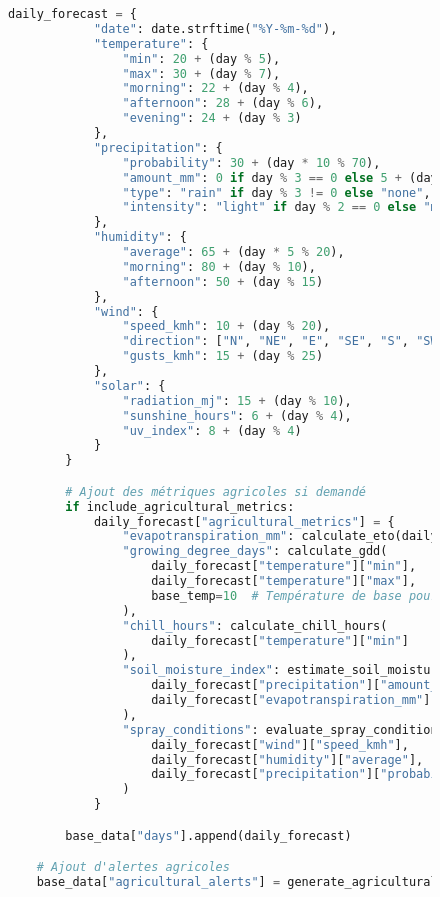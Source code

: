\begin{figure}[H]
\begin{lstlisting}[language=Python, caption=Implémentation d'outils spécialisés pour l'agriculture]
        daily_forecast = {
            "date": date.strftime("%Y-%m-%d"),
            "temperature": {
                "min": 20 + (day % 5),
                "max": 30 + (day % 7),
                "morning": 22 + (day % 4),
                "afternoon": 28 + (day % 6),
                "evening": 24 + (day % 3)
            },
            "precipitation": {
                "probability": 30 + (day * 10 % 70),
                "amount_mm": 0 if day % 3 == 0 else 5 + (day * 3),
                "type": "rain" if day % 3 != 0 else "none",
                "intensity": "light" if day % 2 == 0 else "moderate"
            },
            "humidity": {
                "average": 65 + (day * 5 % 20),
                "morning": 80 + (day % 10),
                "afternoon": 50 + (day % 15)
            },
            "wind": {
                "speed_kmh": 10 + (day % 20),
                "direction": ["N", "NE", "E", "SE", "S", "SW", "W", "NW"][day % 8],
                "gusts_kmh": 15 + (day % 25)
            },
            "solar": {
                "radiation_mj": 15 + (day % 10),
                "sunshine_hours": 6 + (day % 4),
                "uv_index": 8 + (day % 4)
            }
        }

        # Ajout des métriques agricoles si demandé
        if include_agricultural_metrics:
            daily_forecast["agricultural_metrics"] = {
                "evapotranspiration_mm": calculate_eto(daily_forecast),
                "growing_degree_days": calculate_gdd(
                    daily_forecast["temperature"]["min"],
                    daily_forecast["temperature"]["max"],
                    base_temp=10  # Température de base pour le maïs
                ),
                "chill_hours": calculate_chill_hours(
                    daily_forecast["temperature"]["min"]
                ),
                "soil_moisture_index": estimate_soil_moisture(
                    daily_forecast["precipitation"]["amount_mm"],
                    daily_forecast["evapotranspiration_mm"]
                ),
                "spray_conditions": evaluate_spray_conditions(
                    daily_forecast["wind"]["speed_kmh"],
                    daily_forecast["humidity"]["average"],
                    daily_forecast["precipitation"]["probability"]
                )
            }

        base_data["days"].append(daily_forecast)

    # Ajout d'alertes agricoles
    base_data["agricultural_alerts"] = generate_agricultural_alerts(base_data)


\end{lstlisting}
\end{figure}
